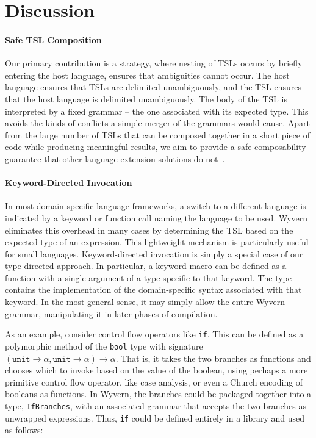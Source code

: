 
\section{Discussion}\label{s:discussion}

\paragraph{Safe TSL Composition}

Our primary contribution is a strategy, where nesting of TSLs occurs by briefly entering the host language, ensures that ambiguities cannot occur. The host language ensures that TSLs are delimited unambiguously, and the TSL ensures that the host language is delimited unambiguously. The body of the TSL is interpreted by a fixed grammar -- the one associated with its expected type. This avoids the kinds of conflicts a simple merger of the grammars would cause.
Apart from the large number of TSLs that can be composed together in a short
piece of code while producing meaningful results, we aim to provide a safe
composability guarantee that other language extension solutions do not~\cite{Erdweg:2013:FEL:2517208.2517210,krahn2008monticore}.

\paragraph{Keyword-Directed Invocation}

In most domain-specific language frameworks, a switch to a different language is indicated by a keyword or function call naming the language to be used. Wyvern eliminates this overhead in many cases by determining the TSL based on the expected type of an expression. This lightweight mechanism is particularly useful for small languages.
Keyword-directed invocation is simply a special case of our type-directed approach. In particular, a keyword macro can be defined as a function with a single argument of a type specific to that keyword. The type contains the implementation of the domain-specific syntax associated with that keyword. In the most general sense, it may simply allow the entire Wyvern
grammar, manipulating it in later phases of compilation. 

As an example, consider control flow operators like \verb|if|. This can be defined as a polymorphic method of the \verb|bool| type with signature $(\texttt{unit} \rightarrow \alpha, \texttt{unit} \rightarrow \alpha) \rightarrow \alpha$. That is, it takes the two branches as functions and chooses which to invoke based on the value of the boolean, using perhaps a more primitive control flow operator, like case analysis, or even a Church encoding of booleans as functions. In Wyvern, the branches could be packaged together into a type, \verb|IfBranches|, with an associated grammar that accepts the two branches as unwrapped expressions. Thus, \verb|if| could be defined entirely in a library and used as follows: 

